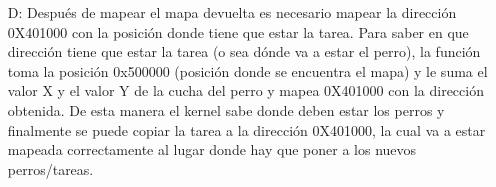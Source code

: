 \begin{itemize}
	\item[D:] Después de mapear el mapa devuelta es necesario mapear la dirección 0X401000 con la posición donde tiene que estar la tarea. Para saber en que dirección tiene que estar la tarea (o sea dónde va a estar el perro), la función toma la posición 0x500000 (posición donde se encuentra el mapa) y le suma el valor X y el valor Y de la cucha del perro y mapea 0X401000 con la dirección obtenida. De esta manera el kernel sabe donde deben estar los perros y finalmente se puede copiar la tarea a la dirección 0X401000, la cual va a estar mapeada correctamente al lugar donde hay que poner a los nuevos perros/tareas.
	
\end{itemize}